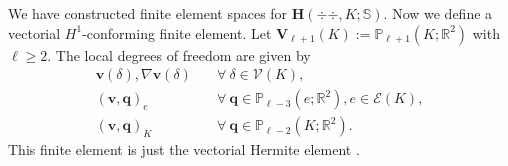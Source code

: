 We have constructed finite element spaces for $\boldsymbol{H}(\div{\div},K; \mathbb{S}) $. Now we define a vectorial $H^1$-conforming finite element. Let $\boldsymbol V_{\ell+1}(K):=\mathbb P_{\ell+1}(K;\mathbb R^2)$ with $\ell\geq2$.
The local degrees of freedom are given by
\begin{align}
\boldsymbol  v (\delta), \nabla\boldsymbol  v (\delta) & \quad\forall~\delta\in \mathcal V(K), \label{HermitfemVdof1}\\
(\boldsymbol  v, \boldsymbol  q)_e & \quad\forall~\boldsymbol  q\in\mathbb P_{\ell-3}(e;\mathbb R^2),  e\in\mathcal E(K),\label{HermitfemVdof2}\\
(\boldsymbol  v, \boldsymbol  q)_K & \quad\forall~\boldsymbol  q\in\mathbb P_{\ell-2}(K;\mathbb R^2). \label{HermitfemVdof3}
\end{align}
This finite element is just the vectorial Hermite element \cite{BrennerScott2008,Ciarlet1978}. 

